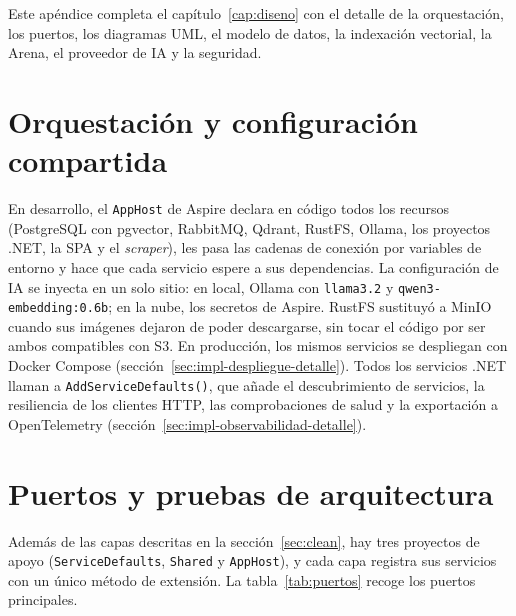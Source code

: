 \label{ap:diseno}

Este apéndice completa el capítulo~\ref{cap:diseno} con el detalle de la orquestación, los puertos, los diagramas UML, el modelo de datos, la indexación vectorial, la Arena, el proveedor de IA y la seguridad.

\section{Orquestación y configuración compartida}
\label{sec:orquestacion-config}

En desarrollo, el \texttt{AppHost} de Aspire \cite{aspire} declara en código todos los recursos (PostgreSQL con pgvector, RabbitMQ, Qdrant, RustFS, Ollama, los proyectos .NET, la SPA y el \emph{scraper}), les pasa las cadenas de conexión por variables de entorno y hace que cada servicio espere a sus dependencias. La configuración de IA se inyecta en un solo sitio: en local, Ollama con \texttt{llama3.2} \cite{llama32} y \texttt{qwen3-embedding:0.6b}; en la nube, los secretos de Aspire. RustFS sustituyó a MinIO cuando sus imágenes dejaron de poder descargarse, sin tocar el código por ser ambos compatibles con S3. En producción, los mismos servicios se despliegan con Docker Compose (sección~\ref{sec:impl-despliegue-detalle}). Todos los servicios .NET llaman a \texttt{AddServiceDefaults()}, que añade el descubrimiento de servicios, la resiliencia de los clientes HTTP, las comprobaciones de salud y la exportación a OpenTelemetry (sección~\ref{sec:impl-observabilidad-detalle}).

\section{Puertos y pruebas de arquitectura}
\label{sec:puertos}

Además de las capas descritas en la sección~\ref{sec:clean}, hay tres proyectos de apoyo (\texttt{ServiceDefaults}, \texttt{Shared} y \texttt{AppHost}), y cada capa registra sus servicios con un único método de extensión. La tabla~\ref{tab:puertos} recoge los puertos principales.

